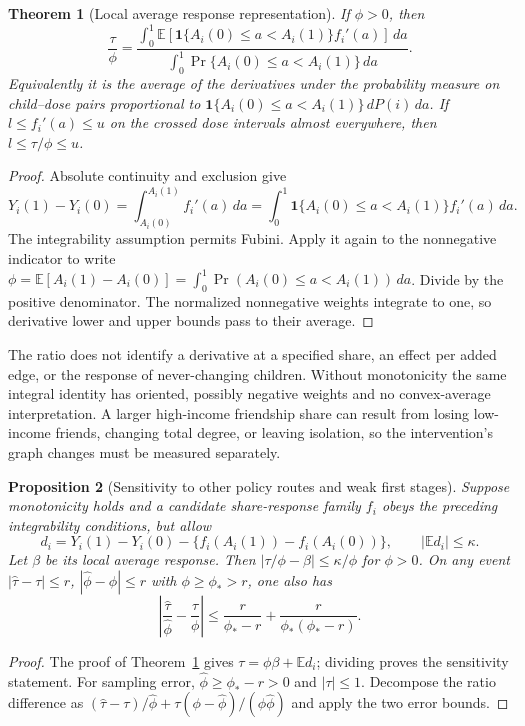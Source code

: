 \documentclass[11pt]{article}
\newtheorem{theorem}{Theorem}
\newtheorem{proposition}[theorem]{Proposition}
\theoremstyle{remark}\newtheorem{remark}[theorem]{Remark}
\newcommand{\E}{\mathbb E}
\newcommand{\Ind}{\mathbf 1}
\begin{document}
\begin{theorem}[Local average response representation]\label{lar}
If $\phi>0$, then
\[
 \frac\tau\phi=
 \frac{\displaystyle\int_0^1
   \E[\Ind\{A_i(0)\leq a<A_i(1)\}f_i'(a)]\,da}
      {\displaystyle\int_0^1
   \Pr\{A_i(0)\leq a<A_i(1)\}\,da}.
\]
Equivalently it is the average of the derivatives under the probability measure on child--dose pairs proportional to
$\Ind\{A_i(0)\leq a<A_i(1)\}\,dP(i)\,da$.
If $l\leq f_i'(a)\leq u$ on the crossed dose intervals almost everywhere, then $l\leq\tau/\phi\leq u$.
\end{theorem}
\begin{proof}
Absolute continuity and exclusion give
\[
 Y_i(1)-Y_i(0)=\int_{A_i(0)}^{A_i(1)}f_i'(a)\,da
 =\int_0^1\Ind\{A_i(0)\leq a<A_i(1)\}f_i'(a)\,da.
\]
The integrability assumption permits Fubini. Apply it again to the nonnegative indicator to write
$\phi=\E[A_i(1)-A_i(0)]=\int_0^1\Pr(A_i(0)\leq a<A_i(1))\,da$.
Divide by the positive denominator. The normalized nonnegative weights integrate to one, so derivative lower and upper bounds pass to their average.
\end{proof}

The ratio does not identify a derivative at a specified share, an effect per added edge, or the response of never-changing children. Without monotonicity the same integral identity has oriented, possibly negative weights and no convex-average interpretation. A larger high-income friendship share can result from losing low-income friends, changing total degree, or leaving isolation, so the intervention's graph changes must be measured separately.

\begin{proposition}[Sensitivity to other policy routes and weak first stages]\label{sensitivity}
Suppose monotonicity holds and a candidate share-response family $f_i$ obeys the preceding integrability conditions, but allow
\[
 d_i=Y_i(1)-Y_i(0)
      -\{f_i(A_i(1))-f_i(A_i(0))\},\qquad |\E d_i|\leq\kappa.
\]
Let $\beta$ be its local average response. Then
$|\tau/\phi-\beta|\leq\kappa/\phi$ for $\phi>0$.
On any event $|\widehat\tau-\tau|\leq r$,
$|\widehat\phi-\phi|\leq r$ with $\phi\geq\phi_*>r$, one also has
\[
 \left|\frac{\widehat\tau}{\widehat\phi}-\frac\tau\phi\right|
 \leq\frac{r}{\phi_*-r}
           +\frac{r}{\phi_*(\phi_*-r)}.
\]
\end{proposition}
\begin{proof}
The proof of Theorem~\ref{lar} gives $\tau=\phi\beta+\E d_i$; dividing proves the sensitivity statement. For sampling error, $\widehat\phi\geq\phi_*-r>0$ and $|\tau|\leq1$. Decompose the ratio difference as
$(\widehat\tau-\tau)/\widehat\phi
 +\tau(\phi-\widehat\phi)/(\phi\widehat\phi)$
and apply the two error bounds.
\end{proof}
\end{document}
